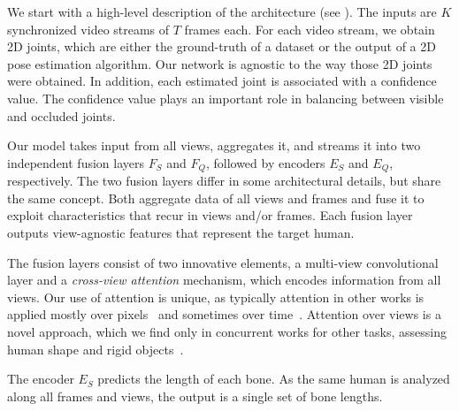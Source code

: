  \label{sec:architecture}



We start with a high-level description of the architecture (see ). 
%
The inputs are $K$ synchronized video streams of $T$ frames each. For each video stream, we obtain 2D joints, which are either the ground-truth of a dataset or the output of a 2D pose estimation algorithm. Our network is agnostic to the way those 2D joints were obtained. In addition, 
each estimated joint is associated with a confidence value.
The confidence value plays an important role in balancing between visible and occluded joints.

Our model takes input from all views, aggregates it, and streams it into two independent fusion layers $F_S$ and $F_Q$, followed by encoders $E_S$ and $E_Q$, respectively. The two fusion layers differ in some architectural details, but share the same concept. Both aggregate data of all views and frames and fuse it to exploit characteristics that recur in views and/or frames. Each fusion layer outputs view-agnostic features that represent the target human. 

The fusion layers consist of two innovative elements, a multi-view convolutional layer and a \emph{cross-view attention} mechanism, which encodes information from all views. Our use of attention is unique, as typically attention in other works is applied mostly over pixels~\cite{khan2021transformers} and sometimes over time~\cite{llopart2020liftformer,lin2020endtoend,liu2020attention}. 
Attention over views is a novel approach, which we find only in concurrent works for other tasks, assessing human shape \cite{zins2021datadriven} and rigid objects~\cite{wang2021multi}. 

The encoder $E_S$ predicts the length of each bone. %
As the same human is analyzed along  all frames and views, the output is a single set of bone lengths. 

